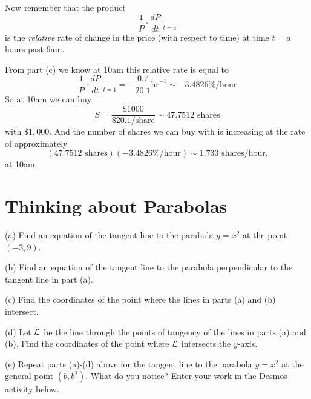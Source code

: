 \documentclass{ximera}
\begin{document}
\begin{question}
\begin{explanation}
\begin{itemize}
Now remember that the product
\[
   \frac{1}{P} \cdot  \frac{dP}{dt}\Big|_{t=a}
\]
is the \emph{relative} rate of change in the price (with respect to time) at time $t=a$ hours past 9am.

From part (c) we know at 10am this relative rate is equal to
\[
      \frac{1}{P} \cdot  \frac{dP}{dt}\Big|_{t=1 } = - \frac{0.7}{20.1}\text{hr}^{-1} \sim - 3.4826\%/\text{hour}
\]
So at 10am we can buy
\[
      S = \frac{\$1000}{\$20.1 /\text{share}} \sim 47.7512 \text{ shares} 
\]
with $\$1,000$. And the number of shares we can buy with is increasing at the rate of approximately
\[
   \left( 47.7512 \text{ shares} \right) \left(  - 3.4826\%/\text{hour} \right)  \sim 1.733 \text{ shares/hour}.
\]
at 10am.
\end{itemize}

\end{explanation}

\end{question}


\section*{Thinking about Parabolas}

\begin{question} \label{Qsdfsdfgg}
(a) Find an equation of the tangent line to the parabola $y=x^2$ at the point $(-3,9)$.

(b) Find an equation of the tangent line to the parabola perpendicular to the tangent line in part (a).

(c) Find the coordinates of the point where the lines in parts (a) and (b) intersect.

(d) Let ${\cal L}$ be the line through the points of tangency of the lines in parts (a) and (b). Find the coordinates of the point where ${\cal L}$ intersects the $y$-axis.

(e) Repeat parts (a)-(d) above for the tangent line to the parabola $y=x^2$ at the general point $(b,b^2)$. What do you notice? Enter your work in the Desmos activity below.

 
\begin{onlineOnly}
    \begin{center}
\end{center}
\end{onlineOnly}


\end{question}
\end{document}
